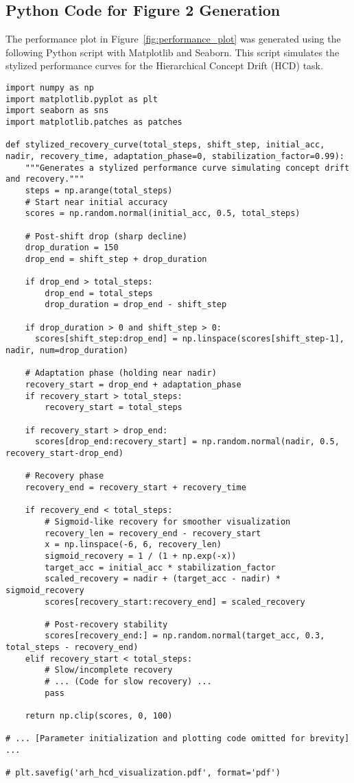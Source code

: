\documentclass{article}
\begin{document}
\begin{appendices}
\section{Python Code for Figure 2 Generation}
\label{sec:appendix_code}
The performance plot in Figure~\ref{fig:performance_plot} was generated using the following Python script with Matplotlib and Seaborn. This script simulates the stylized performance curves for the Hierarchical Concept Drift (HCD) task.

\begin{verbatim}
import numpy as np
import matplotlib.pyplot as plt
import seaborn as sns
import matplotlib.patches as patches

def stylized_recovery_curve(total_steps, shift_step, initial_acc, nadir, recovery_time, adaptation_phase=0, stabilization_factor=0.99):
    """Generates a stylized performance curve simulating concept drift and recovery."""
    steps = np.arange(total_steps)
    # Start near initial accuracy
    scores = np.random.normal(initial_acc, 0.5, total_steps)

    # Post-shift drop (sharp decline)
    drop_duration = 150
    drop_end = shift_step + drop_duration
    
    if drop_end > total_steps:
        drop_end = total_steps
        drop_duration = drop_end - shift_step

    if drop_duration > 0 and shift_step > 0:
      scores[shift_step:drop_end] = np.linspace(scores[shift_step-1], nadir, num=drop_duration)

    # Adaptation phase (holding near nadir)
    recovery_start = drop_end + adaptation_phase
    if recovery_start > total_steps:
        recovery_start = total_steps
        
    if recovery_start > drop_end:
      scores[drop_end:recovery_start] = np.random.normal(nadir, 0.5, recovery_start-drop_end)

    # Recovery phase
    recovery_end = recovery_start + recovery_time
    
    if recovery_end < total_steps:
        # Sigmoid-like recovery for smoother visualization
        recovery_len = recovery_end - recovery_start
        x = np.linspace(-6, 6, recovery_len)
        sigmoid_recovery = 1 / (1 + np.exp(-x))
        target_acc = initial_acc * stabilization_factor
        scaled_recovery = nadir + (target_acc - nadir) * sigmoid_recovery
        scores[recovery_start:recovery_end] = scaled_recovery
        
        # Post-recovery stability
        scores[recovery_end:] = np.random.normal(target_acc, 0.3, total_steps - recovery_end)
    elif recovery_start < total_steps:
        # Slow/incomplete recovery
        # ... (Code for slow recovery) ...
        pass

    return np.clip(scores, 0, 100)

# ... [Parameter initialization and plotting code omitted for brevity] ...

# plt.savefig('arh_hcd_visualization.pdf', format='pdf')
\end{verbatim}

\end{appendices}
\end{document}
